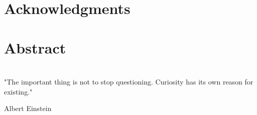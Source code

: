 \sloppy %
\frontmatter


\newpage\thispagestyle{empty}




\chapter*{Acknowledgments}


\chapter*{Abstract}


\chapter*{}
\setlength\epigraphwidth{14.5cm}
\setlength\epigraphrule{0pt}
\makeatletter
{} {}
\makeatother
\vspace*{\fill}
\epigraph{%
\footnotesize\upshape%
"The important thing is not to stop questioning. Curiosity has its own reason for existing."
}{Albert Einstein}
\vspace*{\fill}

\pagestyle{plain}
\tableofcontents

% 

\listoffigures
\listoftables


\listoffixmes